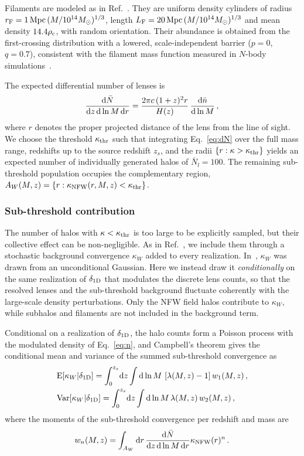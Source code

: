 \documentclass[aps,prd,10pt,nofootinbib,twocolumn,superscriptaddress,floatfix,notitlepage]{revtex4-1}
\newcommand{\Msun}{M_\odot}
\newcommand{\td}{{\rm d}}
\newcommand{\be}{\begin{equation}}
\newcommand{\ee}{\end{equation}}
\newcommand{\bea}{\begin{equation} \begin{aligned}}
\newcommand{\eea}{\end{aligned} \end{equation}}
\newcommand{\B}[1]{{\color{blue} #1}}
\begin{document}
Filaments are modeled as in Ref.~\cite{Vaskonen:2026ubd}. They are uniform density
cylinders of radius $r_{\rm F} = 1\,{\rm Mpc}\,(M/10^{14}\Msun)^{1/3}$, length
$L_{\rm F} = 20\,{\rm Mpc}\,(M/10^{14}\Msun)^{1/3}$ and mean density
$14.4\rho_{\rm c}$, with random orientation. Their abundance is obtained from
the first-crossing distribution with a lowered, scale-independent barrier\B{
($p=0$, $q=0.7$), consistent with the filament mass function measured in
$N$-body simulations~\cite{Yan:2011ux}}.

The expected differential number of lenses is
\be \label{eq:dN}
    \frac{\td \bar N}{\td z \, \td \ln M \, \td r} =
    \frac{2\pi c \, (1+z)^2 r}{H(z)} \, \frac{\td \bar{n}}{\td \ln M} \,,
\ee
where $r$ denotes the proper projected distance of the lens from the line of sight. We choose the threshold $\kappa_{\rm thr}$ such that integrating Eq.~\eqref{eq:dN} over the full mass range, redshifts up to the source redshift $z_s$, and the radii $\{r:\kappa>\kappa_{\rm thr}\}$ yields an expected number of individually generated halos of $\bar N_l = 100$. The remaining sub-threshold population occupies the complementary region, $A_W(M,z) = \{ r :  \kappa_{\rm NFW}(r,M,z) < \kappa_{\rm thr} \}$.

\subsubsection{Sub-threshold contribution}

The number of halos with $\kappa < \kappa_{\rm thr}$ is too large to be explicitly sampled, but their collective effect can be non-negligible. As in Ref.~\cite{Vaskonen:2026ubd}, we include them through a stochastic background convergence $\kappa_W$ added to every realization. In~\cite{Vaskonen:2026ubd}, $\kappa_W$ was drawn from an unconditional Gaussian. Here we instead draw it \emph{conditionally} on the same realization of $\delta_{\rm 1D}$ that modulates the discrete lens counts, so that the resolved lenses and the sub-threshold background fluctuate coherently with the large-scale density perturbations. Only the NFW field halos contribute to $\kappa_W$,  while subhalos and filaments are not included in the background term.

Conditional on a realization of $\delta_{\rm 1D}$, the halo counts form a Poisson process with the modulated density of Eq.~\eqref{eq:n}, and Campbell's theorem gives the conditional mean and variance of the summed sub-threshold convergence as
\bea \label{eq:weakcond}
    &{\rm E}\!\left[ \kappa_W | \delta_{\rm 1D} \right] =
    \int_0^{z_s} \!\td z \int \td \ln M \, \left[\lambda(M,z) - 1\right] w_1(M,z) \,,  \\
    &{\rm Var}\!\left[ \kappa_W | \delta_{\rm 1D} \right] =
    \int_0^{z_s} \!\td z \int \td \ln M \, \lambda(M,z)\, w_2(M,z) \,,
\eea
where the moments of the sub-threshold convergence per redshift and mass are
\be \label{eq:wk}
    w_n(M,z) = \int_{A_W} \td r \,
    \frac{\td \bar N}{\td z \, \td \ln M \, \td r}  \kappa_{\rm NFW}(r)^n \,.
\ee
\end{document}
